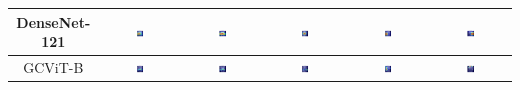 \begin{table}
\begin{tabular}{|c|c|c|c|c|c|}
        DenseNet-121 & \includegraphics[width=0.15\textwidth]{figs/gradcams/gradcam_densenet121_kl0.png} & \includegraphics[width=0.15\textwidth]{figs/gradcams/gradcam_densenet121_kl1.png} & \includegraphics[width=0.15\textwidth]{figs/gradcams/gradcam_densenet121_kl2.png} & \includegraphics[width=0.15\textwidth]{figs/gradcams/gradcam_densenet121_kl3.png} & \includegraphics[width=0.15\textwidth]{figs/gradcams/gradcam_densenet121_kl4.png} \\ \hline
        GCViT-B & \includegraphics[width=0.15\textwidth]{figs/gradcams/gradcam_gcvit_kl0.png} & \includegraphics[width=0.15\textwidth]{figs/gradcams/gradcam_gcvit_kl1.png} & \includegraphics[width=0.15\textwidth]{figs/gradcams/gradcam_gcvit_kl2.png} & \includegraphics[width=0.15\textwidth]{figs/gradcams/gradcam_gcvit_kl3.png} & \includegraphics[width=0.15\textwidth]{figs/gradcams/gradcam_gcvit_kl4.png} \\ \hline

\end{tabular}
\end{table}
